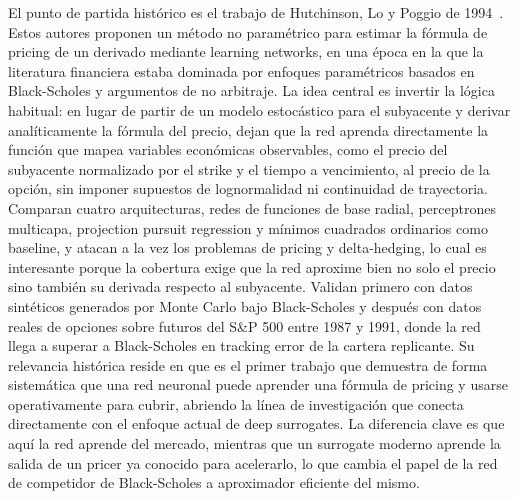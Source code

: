 \documentclass[11pt,a4paper]{article}
\begin{document}
El punto de partida histórico es el trabajo de Hutchinson, Lo y Poggio de 1994~\cite{hutchinson1994}. Estos autores proponen un método no paramétrico para estimar la fórmula de pricing de un derivado mediante learning networks, en una época en la que la literatura financiera estaba dominada por enfoques paramétricos basados en Black-Scholes y argumentos de no arbitraje. La idea central es invertir la lógica habitual: en lugar de partir de un modelo estocástico para el subyacente y derivar analíticamente la fórmula del precio, dejan que la red aprenda directamente la función que mapea variables económicas observables, como el precio del subyacente normalizado por el strike y el tiempo a vencimiento, al precio de la opción, sin imponer supuestos de lognormalidad ni continuidad de trayectoria. Comparan cuatro arquitecturas, redes de funciones de base radial, perceptrones multicapa, projection pursuit regression y mínimos cuadrados ordinarios como baseline, y atacan a la vez los problemas de pricing y delta-hedging, lo cual es interesante porque la cobertura exige que la red aproxime bien no solo el precio sino también su derivada respecto al subyacente. Validan primero con datos sintéticos generados por Monte Carlo bajo Black-Scholes y después con datos reales de opciones sobre futuros del S\&P 500 entre 1987 y 1991, donde la red llega a superar a Black-Scholes en tracking error de la cartera replicante. Su relevancia histórica reside en que es el primer trabajo que demuestra de forma sistemática que una red neuronal puede aprender una fórmula de pricing y usarse operativamente para cubrir, abriendo la línea de investigación que conecta directamente con el enfoque actual de deep surrogates. La diferencia clave es que aquí la red aprende del mercado, mientras que un surrogate moderno aprende la salida de un pricer ya conocido para acelerarlo, lo que cambia el papel de la red de competidor de Black-Scholes a aproximador eficiente del mismo.
\end{document}
